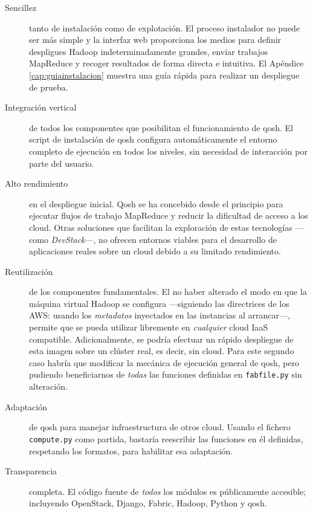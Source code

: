\begin{description}
    \item[Sencillez] tanto de instalaci\'on como de explotaci\'on. El proceso instalador no puede ser m\'as simple y la interfaz web proporciona los medios para definir despligues Hadoop indeterminadamente grandes, enviar trabajos MapReduce y recoger resultados de forma directa e intuitiva. El Ap\'endice \ref{cap:guiainstalacion} muestra una gu\'ia r\'apida para realizar un despliegue de prueba.
    \item[Integraci\'on vertical] de todos los componentes que posibilitan el fun\-cio\-na\-mien\-to de qosh. El script de instalaci\'on de qosh configura autom\'aticamente el entorno completo de ejecuci\'on en todos los niveles, sin necesidad de interacci\'on por parte del usuario.
    \item[Alto rendimiento] en el despliegue inicial. Qosh se ha concebido desde el principio para ejecutar flujos de trabajo MapReduce y reducir la dificultad de acceso a los cloud. Otras soluciones que facilitan la exploraci\'on de estas tecnolog\'ias ---como \emph{DevStack}---, no ofrecen entornos viables para el desarrollo de aplicaciones reales sobre un cloud debido a su li\-mi\-ta\-do rendimiento.
    \item[Reutilizaci\'on] de los componentes fundamentales. El no haber alterado el modo en que la m\'aquina virtual Hadoop se configura ---siguiendo las directrices de los AWS: usando los \emph{metadatos} inyectados en las instancias al arrancar---, permite que se pueda utilizar libremente en \emph{cualquier} cloud IaaS com\-pa\-ti\-ble. Adicionalmente, se podr\'ia efec\-tuar un r\'apido despliegue de esta imagen sobre un cl\'uster real, es decir, sin cloud. Para este segundo caso habr\'ia que modificar la mec\'anica de ejecuci\'on ge\-ne\-ral de qosh, pero pudiendo beneficiarnos de \emph{todas} las funciones definidas en \texttt{fabfile.py} sin alteraci\'on.
    \item[Adaptaci\'on] de qosh para manejar infraestructura de otros cloud. Usando el fichero \texttt{compute.py} como partida, bastar\'ia reescribir las funciones en \'el definidas, respetando los formatos, para habilitar esa adaptaci\'on.
    \item[Transparencia] completa. El c\'odigo fuente de \emph{todos} los m\'odulos es p\'ublicamente accesible; incluyendo OpenStack, Django, Fabric, Hadoop, Py\-thon y qosh.

\end{description}
